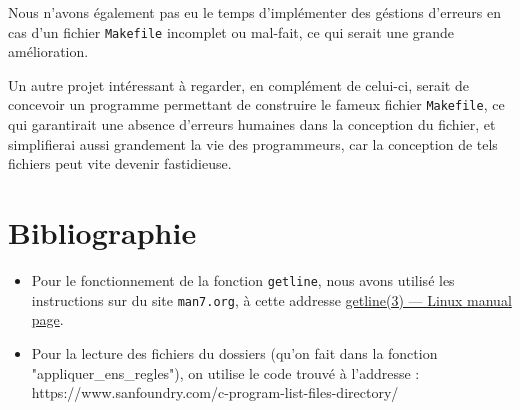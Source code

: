 \documentclass{article}
\begin{document}
Nous n’avons également pas eu le temps d’implémenter des géstions d’erreurs en cas d’un fichier \texttt{Makefile} incomplet ou mal-fait, ce qui serait une grande amélioration.

Un autre projet intéressant à regarder, en complément de celui-ci, serait de concevoir un programme permettant de construire le fameux fichier \texttt{Makefile}, ce qui garantirait une absence d’erreurs humaines dans la conception du fichier, et simplifierai aussi grandement la vie des programmeurs, car la conception de tels fichiers peut vite devenir fastidieuse.

\section{Bibliographie}

\begin{itemize}

	\item Pour le fonctionnement de la fonction \texttt{getline}, nous avons utilisé les instructions sur du site \texttt{man7.org}, à cette addresse \href{https://www.man7.org/linux/man-pages/man3/getline.3.html}{getline(3) — Linux manual page}.

	\item Pour la lecture des fichiers du dossiers (qu’on fait dans la fonction "appliquer\_ens\_regles"), on utilise le code trouvé à l’addresse : https://www.sanfoundry.com/c-program-list-files-directory/

\end{itemize}
\end{document}
